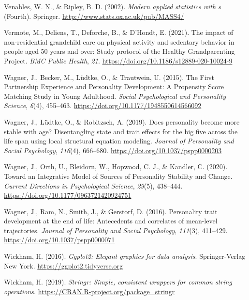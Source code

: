 \documentclass[
  english,
  man,floatsintext]{apa7}
\begin{document}
\leavevmode\hypertarget{ref-R-MASS}{}%
Venables, W. N., \& Ripley, B. D. (2002). \emph{Modern applied statistics with s} (Fourth). Springer. \url{http://www.stats.ox.ac.uk/pub/MASS4/}

\leavevmode\hypertarget{ref-vermoteImpactNonresidentialGrandchild2021a}{}%
Vermote, M., Deliens, T., Deforche, B., \& D'Hondt, E. (2021). The impact of non-residential grandchild care on physical activity and sedentary behavior in people aged 50 years and over: Study protocol of the Healthy Grandparenting Project. \emph{BMC Public Health}, \emph{21}. \url{https://doi.org/10.1186/s12889-020-10024-9}

\leavevmode\hypertarget{ref-wagnerFirstPartnershipExperience2015}{}%
Wagner, J., Becker, M., Lüdtke, O., \& Trautwein, U. (2015). The First Partnership Experience and Personality Development: A Propensity Score Matching Study in Young Adulthood. \emph{Social Psychological and Personality Science}, \emph{6}(4), 455--463. \url{https://doi.org/10.1177/1948550614566092}

\leavevmode\hypertarget{ref-wagnerDoesPersonalityBecome2019}{}%
Wagner, J., Lüdtke, O., \& Robitzsch, A. (2019). Does personality become more stable with age? Disentangling state and trait effects for the big five across the life span using local structural equation modeling. \emph{Journal of Personality and Social Psychology}, \emph{116}(4), 666--680. \url{https://doi.org/10.1037/pspp0000203}

\leavevmode\hypertarget{ref-wagnerIntegrativeModelSources2020}{}%
Wagner, J., Orth, U., Bleidorn, W., Hopwood, C. J., \& Kandler, C. (2020). Toward an Integrative Model of Sources of Personality Stability and Change. \emph{Current Directions in Psychological Science}, \emph{29}(5), 438--444. \url{https://doi.org/10.1177/0963721420924751}

\leavevmode\hypertarget{ref-wagnerPersonalityTraitDevelopment2016}{}%
Wagner, J., Ram, N., Smith, J., \& Gerstorf, D. (2016). Personality trait development at the end of life: Antecedents and correlates of mean-level trajectories. \emph{Journal of Personality and Social Psychology}, \emph{111}(3), 411--429. \url{https://doi.org/10.1037/pspp0000071}

\leavevmode\hypertarget{ref-R-ggplot2}{}%
Wickham, H. (2016). \emph{Ggplot2: Elegant graphics for data analysis}. Springer-Verlag New York. \url{https://ggplot2.tidyverse.org}

\leavevmode\hypertarget{ref-R-stringr}{}%
Wickham, H. (2019). \emph{Stringr: Simple, consistent wrappers for common string operations}. \url{https://CRAN.R-project.org/package=stringr}
\end{document}
